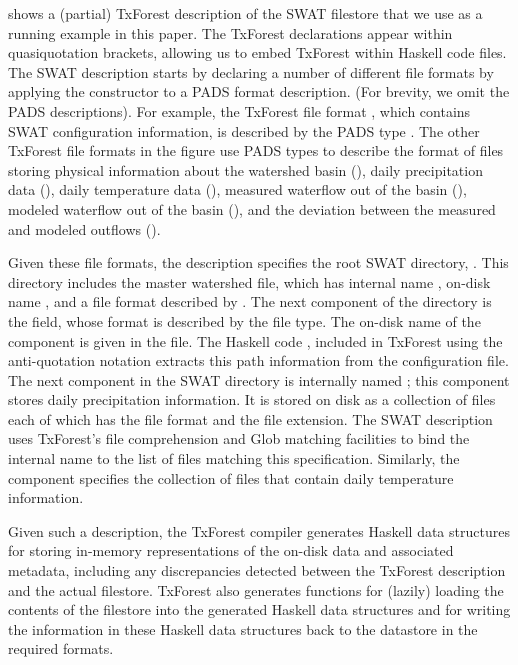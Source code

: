 shows a (partial) TxForest description of the SWAT filestore that we use
as a running example in this paper.
The TxForest declarations appear within \cd{[txforest|...|]}
quasiquotation brackets, allowing us to embed TxForest within Haskell
code files.  The SWAT description starts by declaring a number of
different file formats by applying the  constructor to
a PADS format description.  (For brevity, we omit the PADS
descriptions).   For example, the TxForest file format
, which contains SWAT configuration information,
is described by the PADS type .
The other TxForest file formats in the figure use PADS types to
describe the format of files storing 
physical information about the watershed basin (),
daily precipitation data (),
daily temperature data (),
measured waterflow out of the basin (),
modeled waterflow out of the basin (),
and the deviation between the measured and modeled outflows ().

Given these file formats, the description specifies the root SWAT
directory, .  This directory includes the master
watershed file, which has internal name , on-disk name
, and a file format described by
.  The next component of the directory is the
 field, whose format is described by the 
file type.  The on-disk name of the  component is given
in the  file.  The Haskell code ,
included in TxForest using the anti-quotation notation
 extracts this path information from the configuration
file.  The next component in the SWAT directory is internally named
; this component stores daily precipitation information.
It is stored on disk as a collection of files each of which has the
 file format and the  file extension.  The
SWAT description uses TxForest's file comprehension and Glob matching
facilities to bind the  internal name to the list of files
matching this specification.  Similarly, the  component
specifies the collection of files that contain daily temperature
information.

Given such a description, the TxForest compiler generates Haskell data
structures for storing in-memory representations of the on-disk data
and associated metadata, including any discrepancies detected between
the TxForest description and the actual filestore.  TxForest also
generates functions for (lazily) loading the contents of the filestore
into the generated Haskell data structures and for writing the
information in these Haskell data structures back to the datastore in
the required formats.

